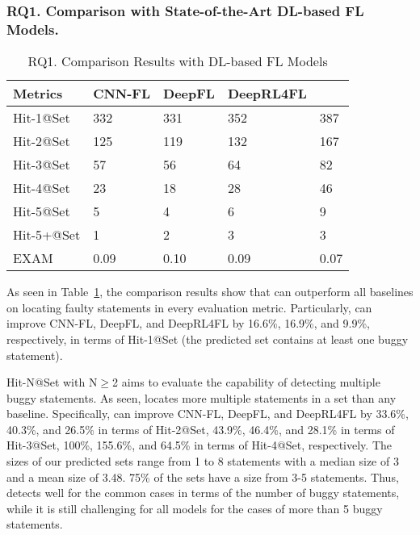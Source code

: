 \subsubsection{\bf RQ1. Comparison with State-of-the-Art DL-based FL Models.}

\begin{table}[t]
	\caption{RQ1. Comparison Results with DL-based FL Models}
	{\small
		\begin{center}
			\renewcommand{\arraystretch}{1}
				\begin{tabular}{p{1.5cm}<{\centering}|p{1cm}<{\centering}|p{0.8cm}<{\centering}|p{1.2cm}<{\centering}|p{1.2cm}<{\centering}}
				\hline
				Metrics & CNN-FL & DeepFL & DeepRL4FL & \tool \\			
				\hline
				Hit-1@Set   & 332 & 331 & 352 & 387 \\
				Hit-2@Set	& 125 & 119 & 132 & 167 \\
				Hit-3@Set	& 57 & 56 & 64 & 82 \\
				Hit-4@Set	& 23 & 18 & 28 & 46 \\
				Hit-5@Set	& 5 & 4 & 6 & 9 \\
				Hit-5+@Set	& 1 & 2 & 3 & 3 \\
				EXAM     	& 0.09 & 0.10 & 0.09 & 0.07 \\
				\hline
			\end{tabular}
			
			\label{fig:rq1-0}
		\end{center}
	}
\end{table}

As seen in Table~\ref{fig:rq1-0}, the comparison results show that
{\tool} can outperform all baselines on locating faulty statements in
every evaluation metric. Particularly, {\tool} can improve CNN-FL,
DeepFL, and DeepRL4FL by 16.6\%, 16.9\%, and 9.9\%, respectively, in
terms of Hit-1@Set (the predicted set contains at least one buggy
statement).

Hit-N@Set with N$\geq$2 aims to evaluate the capability of detecting
multiple buggy statements. As seen, {\tool} locates more multiple
statements in a set than any baseline. Specifically, {\tool} can
improve CNN-FL, DeepFL, and DeepRL4FL by 33.6\%, 40.3\%, and 26.5\% in
terms of Hit-2@Set, 43.9\%, 46.4\%, and 28.1\% in terms of Hit-3@Set,
100\%, 155.6\%, and 64.5\% in terms of Hit-4@Set, respectively.
%
The sizes of our predicted sets range from 1 to 8 statements with a
median size of 3 and a mean size of 3.48. 75\% of the sets have a size from 3-5 statements. %
Thus, {\tool} detects well for the common cases in terms of the number of buggy statements, while it is still challenging for all models for the cases of more than 5 buggy statements.

